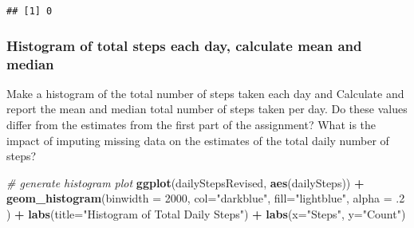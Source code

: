 \documentclass[]{article}
\newenvironment{Shaded}{\begin{snugshade}}{\end{snugshade}}
\newcommand{\CommentTok}[1]{\textcolor[rgb]{0.56,0.35,0.01}{\textit{#1}}}
\newcommand{\DataTypeTok}[1]{\textcolor[rgb]{0.13,0.29,0.53}{#1}}
\newcommand{\DecValTok}[1]{\textcolor[rgb]{0.00,0.00,0.81}{#1}}
\newcommand{\FloatTok}[1]{\textcolor[rgb]{0.00,0.00,0.81}{#1}}
\newcommand{\KeywordTok}[1]{\textcolor[rgb]{0.13,0.29,0.53}{\textbf{#1}}}
\newcommand{\NormalTok}[1]{#1}
\newcommand{\OperatorTok}[1]{\textcolor[rgb]{0.81,0.36,0.00}{\textbf{#1}}}
\newcommand{\StringTok}[1]{\textcolor[rgb]{0.31,0.60,0.02}{#1}}
\begin{document}
\begin{verbatim}
## [1] 0
\end{verbatim}

\hypertarget{histogram-of-total-steps-each-day-calculate-mean-and-median}{%
\subsubsection{Histogram of total steps each day, calculate mean and
median}\label{histogram-of-total-steps-each-day-calculate-mean-and-median}}

Make a histogram of the total number of steps taken each day and
Calculate and report the mean and median total number of steps taken per
day. Do these values differ from the estimates from the first part of
the assignment? What is the impact of imputing missing data on the
estimates of the total daily number of steps?

\begin{Shaded}
\end{Shaded}

\begin{Shaded}
\begin{Highlighting}[]
\CommentTok{# generate histogram plot}
\KeywordTok{ggplot}\NormalTok{(dailyStepsRevised, }\KeywordTok{aes}\NormalTok{(dailySteps)) }\OperatorTok{+}\StringTok{ }
\StringTok{    }\KeywordTok{geom_histogram}\NormalTok{(}\DataTypeTok{binwidth =} \DecValTok{2000}\NormalTok{,}
                    \DataTypeTok{col=}\StringTok{"darkblue"}\NormalTok{, }
                    \DataTypeTok{fill=}\StringTok{"lightblue"}\NormalTok{, }
                    \DataTypeTok{alpha =} \FloatTok{.2}
\NormalTok{                   ) }\OperatorTok{+}\StringTok{ }
\StringTok{    }\KeywordTok{labs}\NormalTok{(}\DataTypeTok{title=}\StringTok{"Histogram of Total Daily Steps"}\NormalTok{) }\OperatorTok{+}
\StringTok{    }\KeywordTok{labs}\NormalTok{(}\DataTypeTok{x=}\StringTok{"Steps"}\NormalTok{, }\DataTypeTok{y=}\StringTok{"Count"}\NormalTok{)}
\end{Highlighting}
\end{Shaded}
\end{document}
